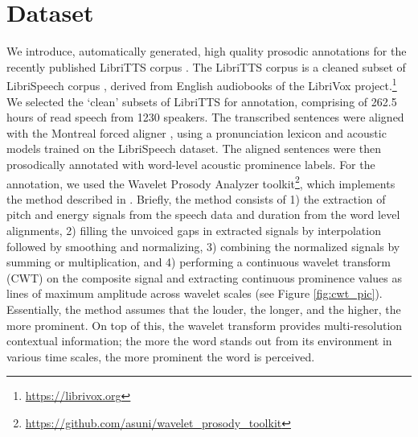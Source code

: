 \documentclass[11pt]{article}
\begin{document}
\section{Dataset} \label{sec:dataset}
We introduce, automatically generated, high quality prosodic annotations for the recently published LibriTTS corpus \cite{zen2019libritts}. The LibriTTS corpus is a cleaned subset of LibriSpeech corpus \cite{panayotov2015librispeech}, derived from English audiobooks of the LibriVox project.\footnote{\url{https://librivox.org}} 
We selected the `clean' subsets of LibriTTS for annotation, comprising of 262.5 hours of read speech from 1230 speakers. The transcribed sentences were aligned with the Montreal forced aligner \cite{mcauliffe2017montreal}, using a pronunciation lexicon and acoustic models trained on the LibriSpeech dataset. The aligned sentences were then prosodically annotated with word-level acoustic prominence labels. For the annotation, we used the Wavelet Prosody Analyzer toolkit\footnote{\url{https://github.com/asuni/wavelet_prosody_toolkit}}, which implements the method described in \cite{suni2017hierarchical}. Briefly, the method consists of 1) the extraction of pitch and energy signals from the speech data and duration from the word level alignments, 2) filling the unvoiced gaps in extracted signals by interpolation followed by smoothing and normalizing, 3) combining the normalized signals by summing or multiplication, and 4) performing a continuous wavelet transform (CWT) on the composite signal and extracting continuous prominence values as lines of maximum amplitude across wavelet scales (see Figure \ref{fig:cwt_pic}).  Essentially, the method assumes that the louder, the longer, and the higher, the more prominent. On top of this, the wavelet transform provides multi-resolution contextual information; the more the word stands out from its environment in various time scales, the more prominent the word is perceived.
\end{document}

